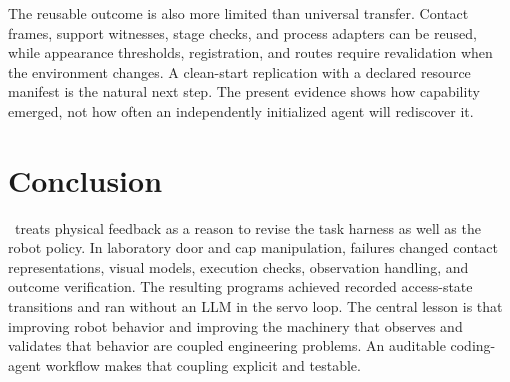 The reusable outcome is also more limited than universal transfer. Contact
frames, support witnesses, stage checks, and process adapters can be reused,
while appearance thresholds, registration, and routes require revalidation
when the environment changes. A clean-start replication with a declared
resource manifest is the natural next step. The present evidence shows how
capability emerged, not how often an independently initialized agent will
rediscover it.

\section{Conclusion}
\system\ treats physical feedback as a reason to revise the task harness as
well as the robot policy. In laboratory door and cap manipulation, failures
changed contact representations, visual models, execution checks, observation
handling, and outcome verification. The resulting programs achieved recorded
access-state transitions and ran without an LLM in the servo loop. The
central lesson is that improving robot behavior and improving the machinery
that observes and validates that behavior are coupled engineering problems.
An auditable coding-agent workflow makes that coupling explicit and testable.





